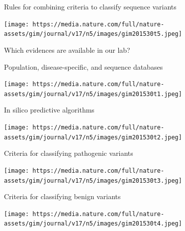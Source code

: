 \documentclass[
  ignorenonframetext,
]{beamer}
\begin{document}
\begin{frame}{Rules for combining criteria to classify sequence
variants}
\protect\hypertarget{rules-for-combining-criteria-to-classify-sequence-variants}{}

\texttt{[image: https://media.nature.com/full/nature-assets/gim/journal/v17/n5/images/gim201530t5.jpeg]}

\end{frame}

\begin{frame}{Which evidences are available in our lab?}
\protect\hypertarget{which-evidences-are-available-in-our-lab}{}

\end{frame}

\begin{frame}{Population, disease-specific, and sequence databases}
\protect\hypertarget{population-disease-specific-and-sequence-databases}{}

\texttt{[image: https://media.nature.com/full/nature-assets/gim/journal/v17/n5/images/gim201530t1.jpeg]}

\end{frame}

\begin{frame}{In silico predictive algorithms}
\protect\hypertarget{in-silico-predictive-algorithms}{}

\texttt{[image: https://media.nature.com/full/nature-assets/gim/journal/v17/n5/images/gim201530t2.jpeg]}

\end{frame}

\begin{frame}{Criteria for classifying pathogenic variants}
\protect\hypertarget{criteria-for-classifying-pathogenic-variants}{}

\texttt{[image: https://media.nature.com/full/nature-assets/gim/journal/v17/n5/images/gim201530t3.jpeg]}

\end{frame}

\begin{frame}{Criteria for classifying benign variants}
\protect\hypertarget{criteria-for-classifying-benign-variants}{}

\texttt{[image: https://media.nature.com/full/nature-assets/gim/journal/v17/n5/images/gim201530t4.jpeg]}

\end{frame}
\end{document}
